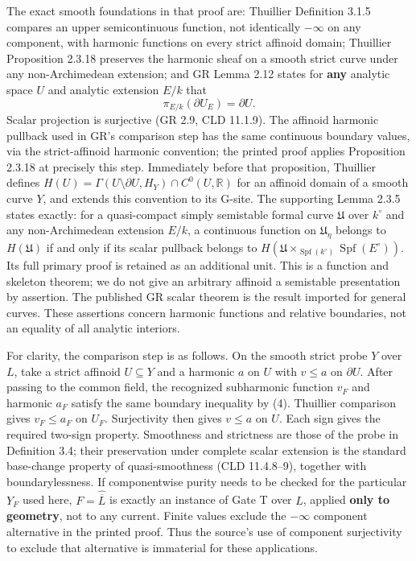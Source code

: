 \documentclass[
  11pt,
]{article}
\begin{document}
The exact smooth foundations in that proof are: Thuillier Definition
3.1.5 compares an upper semicontinuous function, not identically
\(-\infty\) on any component, with harmonic functions on every strict
affinoid domain; Thuillier Proposition 2.3.18 preserves the harmonic
sheaf on a smooth strict curve under any non-Archimedean extension; and
GR Lemma 2.12 states for \textbf{any} analytic space \(U\) and analytic
extension \(E/k\) that \[
                         \pi_{E/k}(\partial U_E)=\partial U.       \tag{4}
\] Scalar projection is surjective (GR 2.9, CLD 11.1.9). The affinoid
harmonic pullback used in GR's comparison step has the same continuous
boundary values, via the strict-affinoid harmonic convention; the
printed proof applies Proposition 2.3.18 at precisely this step.
Immediately before that proposition, Thuillier defines
\(H(U)=\Gamma(U\setminus\partial U,H_Y)\cap C^0(U,\mathbb{R})\) for an
affinoid domain of a smooth curve \(Y\), and extends this convention to
its G-site. The supporting Lemma 2.3.5 states exactly: for a
quasi-compact simply semistable formal curve \(\mathfrak U\) over
\(k^\circ\) and any non-Archimedean extension \(E/k\), a continuous
function on \(\mathfrak U_\eta\) belongs to \(H(\mathfrak U)\) if and
only if its scalar pullback belongs to
\(H(\mathfrak U\times_{\operatorname{Spf}(k^\circ)}\operatorname{Spf}(E^\circ))\).
Its full primary proof is retained as an additional unit. This is a
function and skeleton theorem; we do not give an arbitrary affinoid a
semistable presentation by assertion. The published GR scalar theorem is
the result imported for general curves. These assertions concern
harmonic functions and relative boundaries, not an equality of all
analytic interiors.

For clarity, the comparison step is as follows. On the smooth strict
probe \(Y\) over \(L\), take a strict affinoid \(U\subseteq Y\) and a
harmonic \(a\) on \(U\) with \(v\leq a\) on \(\partial U\). After
passing to the common field, the recognized subharmonic function \(v_F\)
and harmonic \(a_F\) satisfy the same boundary inequality by (4).
Thuillier comparison gives \(v_F\leq a_F\) on \(U_F\). Surjectivity then
gives \(v\leq a\) on \(U\). Each sign gives the required two-sign
property. Smoothness and strictness are those of the probe in Definition
3.4; their preservation under complete scalar extension is the standard
base-change property of quasi-smoothness (CLD 11.4.8--9), together with
boundarylessness. If componentwise purity needs to be checked for the
particular \(Y_F\) used here, \(F=\widehat{\overline L}\) is exactly an
instance of Gate T over \(L\), applied \textbf{only to geometry}, not to
any current. Finite values exclude the \(-\infty\) component alternative
in the printed proof. Thus the source's use of component surjectivity to
exclude that alternative is immaterial for these applications.
\end{document}
